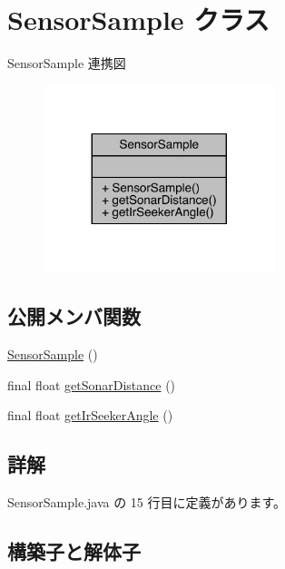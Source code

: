 \hypertarget{class_sensor_sample}{}\section{Sensor\+Sample クラス}
\label{class_sensor_sample}


Sensor\+Sample 連携図
\nopagebreak
\begin{figure}[H]
\begin{center}
\leavevmode
\includegraphics[width=191pt]{d2/dfb/class_sensor_sample__coll__graph}
\end{center}
\end{figure}
\subsection*{公開メンバ関数}
\begin{DoxyCompactItemize}
\item 
\mbox{\hyperlink{class_sensor_sample_aabd656c6e5c809833e6d31d6961b4d2b}{Sensor\+Sample}} ()
\item 
final float \mbox{\hyperlink{class_sensor_sample_ac79200df350ed399b1a7ef2ea0285d69}{get\+Sonar\+Distance}} ()
\item 
final float \mbox{\hyperlink{class_sensor_sample_a2340964e246fe0df347e0247329175fe}{get\+Ir\+Seeker\+Angle}} ()
\end{DoxyCompactItemize}


\subsection{詳解}


 Sensor\+Sample.\+java の 15 行目に定義があります。



\subsection{構築子と解体子}
\mbox{\label{class_sensor_sample_aabd656c6e5c809833e6d31d6961b4d2b}} 
